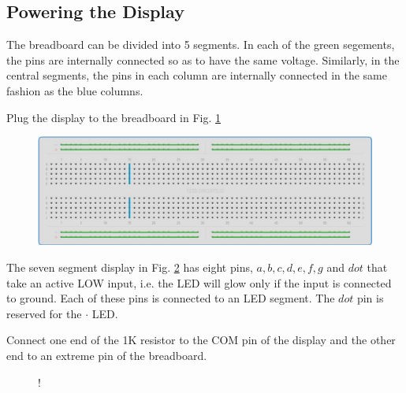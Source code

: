 \subsection{Powering the Display}
The breadboard can be divided into 5 segments.  In each of the green segements, the pins are internally connected so as to have the same voltage.  Similarly, in the central segments, the pins in each column  are internally connected in the same fashion as the blue columns. 

\begin{problem}
	Plug the display to the breadboard in Fig. \ref{fig:breadboard}
\end{problem}
\begin{figure}[!h]
\begin{center}
\includegraphics[width=\columnwidth]{./figs/breadboard}
\end{center}
\caption{}
\label{fig:breadboard}
\end{figure}

The seven segment display in Fig. \ref{fig:sevenseg} has eight pins, $a, b, c, d, e, f, g$ and $dot$ that take an active LOW input, i.e.  the LED will glow only if the input is connected to ground.  Each of these pins is connected to an LED segment.  The $dot$ pin is  reserved for the $\cdot$ LED.  

%

\begin{problem}
	Connect one end of the 1K resistor to the COM pin of the display and the other end to an extreme pin of the breadboard.	
\end{problem}
%
%
%
\begin{figure}[!h]
\begin{center}
 {!} {

}
\end{center}
\caption{}
\label{fig:sevenseg}
\end{figure}

